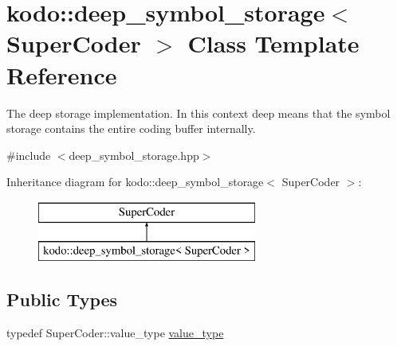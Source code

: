\hypertarget{classkodo_1_1deep__symbol__storage}{\section{kodo\-:\-:deep\-\_\-symbol\-\_\-storage$<$ Super\-Coder $>$ Class Template Reference}
\label{classkodo_1_1deep__symbol__storage}
}


The deep storage implementation. In this context deep means that the symbol storage contains the entire coding buffer internally.  




{\ttfamily \#include $<$deep\-\_\-symbol\-\_\-storage.\-hpp$>$}

Inheritance diagram for kodo\-:\-:deep\-\_\-symbol\-\_\-storage$<$ Super\-Coder $>$\-:\begin{figure}[H]
\begin{center}
\leavevmode
\includegraphics[height=2.000000cm]{classkodo_1_1deep__symbol__storage}
\end{center}
\end{figure}
\subsection*{Public Types}
\begin{DoxyCompactItemize}
\item 
typedef Super\-Coder\-::value\-\_\-type \hyperlink{classkodo_1_1deep__symbol__storage_ab362e1273dc5cd41dceca6e3ea9199c2}{value\-\_\-type}
\begin{DoxyCompactList}\small\item\em \end{DoxyCompactList}\end{DoxyCompactItemize}
